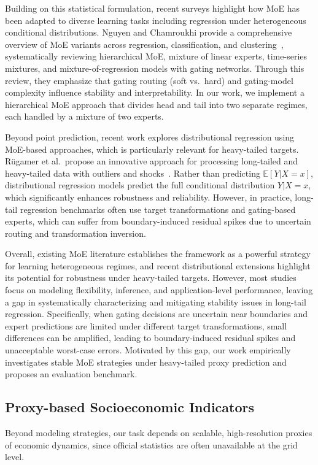 \documentclass[11pt,conference,onecolumn]{IEEEtran}
\begin{document}
Building on this statistical formulation, recent surveys highlight how MoE has been adapted to diverse learning tasks including regression under heterogeneous conditional distributions. Nguyen and Chamroukhi provide a comprehensive overview of MoE variants across regression, classification, and clustering~\cite{nguyen2018overviewmoe}, systematically reviewing hierarchical MoE, mixture of linear experts, time-series mixtures, and mixture-of-regression models with gating networks. Through this review, they emphasize that gating routing (soft vs.\ hard) and gating-model complexity influence stability and interpretability. In our work, we implement a hierarchical MoE approach that divides head and tail into two separate regimes, each handled by a mixture of two experts.

Beyond point prediction, recent work explores distributional regression using MoE-based approaches, which is particularly relevant for heavy-tailed targets. Rügamer et al.\ propose an innovative approach for processing long-tailed and heavy-tailed data with outliers and shocks~\cite{rugamer2024mixdistreg}. Rather than predicting $\mathbb{E}[Y|X = x]$, distributional regression models predict the full conditional distribution $Y|X=x$, which significantly enhances robustness and reliability. However, in practice, long-tail regression benchmarks often use target transformations and gating-based experts, which can suffer from boundary-induced residual spikes due to uncertain routing and transformation inversion.

Overall, existing MoE literature establishes the framework as a powerful strategy for learning heterogeneous regimes, and recent distributional extensions highlight its potential for robustness under heavy-tailed targets. However, most studies focus on modeling flexibility, inference, and application-level performance, leaving a gap in systematically characterizing and mitigating stability issues in long-tail regression. Specifically, when gating decisions are uncertain near boundaries and expert predictions are limited under different target transformations, small differences can be amplified, leading to boundary-induced residual spikes and unacceptable worst-case errors. Motivated by this gap, our work empirically investigates stable MoE strategies under heavy-tailed proxy prediction and proposes an evaluation benchmark.

\subsection{Proxy-based Socioeconomic Indicators}
Beyond modeling strategies, our task depends on scalable, high-resolution proxies of economic dynamics, since official statistics are often unavailable at the grid level.
\end{document}
